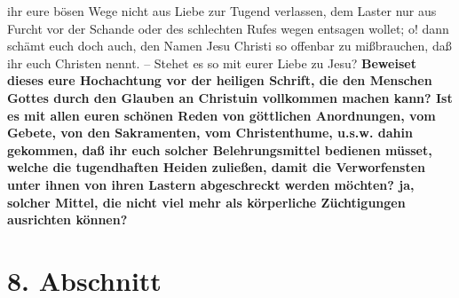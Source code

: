 {ihr eure bösen Wege nicht aus Liebe zur Tugend verlassen, dem Laster nur aus
Furcht vor der Schande oder des schlechten Rufes wegen entsagen wollet; o! dann
schämt euch doch auch, den Namen Jesu Christi so offenbar zu mißbrauchen, daß
ihr euch Christen nennt. -- Stehet es so mit eurer Liebe zu Jesu?
\textbf{Beweiset dieses
eure Hochachtung vor der heiligen Schrift, die den
Menschen Gottes durch den
Glauben an Christuin vollkommen machen kann? Ist es mit allen euren schönen
Reden von göttlichen Anordnungen, vom Gebete, von den
Sakramenten, vom
Christenthume, u.s.w. dahin gekommen, daß ihr euch solcher Belehrungsmittel
bedienen müsset, welche die tugendhaften Heiden zuließen, damit die
Verworfensten unter ihnen von ihren Lastern abgeschreckt werden möchten? ja,
solcher Mittel, die nicht viel mehr als körperliche Züchtigungen ausrichten
können?}
\label{ref:17_07_einwand_end}

\section{8. Abschnitt} \label{kap17_ab8}

}
